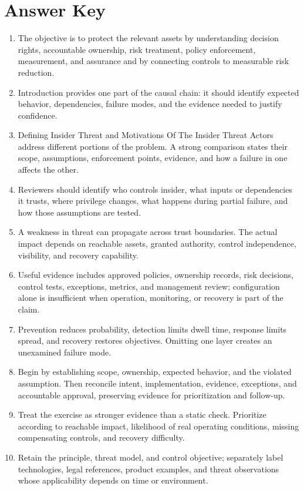\documentclass[11pt,letterpaper]{article}
\begin{document}
\section*{Answer Key}
\begin{enumerate}
\item The objective is to protect the relevant assets by understanding decision rights, accountable ownership, risk treatment, policy enforcement, measurement, and assurance and by connecting controls to measurable risk reduction.
\item Introduction provides one part of the causal chain: it should identify expected behavior, dependencies, failure modes, and the evidence needed to justify confidence.
\item Defining Insider Threat and Motivations Of The Insider Threat Actors address different portions of the problem. A strong comparison states their scope, assumptions, enforcement points, evidence, and how a failure in one affects the other.
\item Reviewers should identify who controls insider, what inputs or dependencies it trusts, where privilege changes, what happens during partial failure, and how those assumptions are tested.
\item A weakness in threat can propagate across trust boundaries. The actual impact depends on reachable assets, granted authority, control independence, visibility, and recovery capability.
\item Useful evidence includes approved policies, ownership records, risk decisions, control tests, exceptions, metrics, and management review; configuration alone is insufficient when operation, monitoring, or recovery is part of the claim.
\item Prevention reduces probability, detection limits dwell time, response limits spread, and recovery restores objectives. Omitting one layer creates an unexamined failure mode.
\item Begin by establishing scope, ownership, expected behavior, and the violated assumption. Then reconcile intent, implementation, evidence, exceptions, and accountable approval, preserving evidence for prioritization and follow-up.
\item Treat the exercise as stronger evidence than a static check. Prioritize according to reachable impact, likelihood of real operating conditions, missing compensating controls, and recovery difficulty.
\item Retain the principle, threat model, and control objective; separately label technologies, legal references, product examples, and threat observations whose applicability depends on time or environment.
\end{enumerate}
\end{document}
